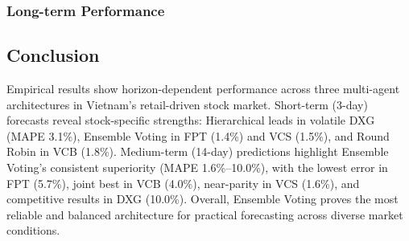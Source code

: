 \documentclass{ieeeaccess}
\begin{document}
\subsubsection{Long-term Performance}
\begin{table}[!h]
\centering
\caption{Average Long-term Performance of Prediction Architectures Across Stocks (LLM: Google Gemini 2.0 Flash)}
\end{table}

\subsection{Conclusion}
Empirical results show horizon-dependent performance across three multi-agent architectures in Vietnam's retail-driven stock market. Short-term (3-day) forecasts reveal stock-specific strengths: Hierarchical leads in volatile DXG (MAPE 3.1\%), Ensemble Voting in FPT (1.4\%) and VCS (1.5\%), and Round Robin in VCB (1.8\%). Medium-term (14-day) predictions highlight Ensemble Voting's consistent superiority (MAPE 1.6\%–10.0\%), with the lowest error in FPT (5.7\%), joint best in VCB (4.0\%), near-parity in VCS (1.6\%), and competitive results in DXG (10.0\%). Overall, Ensemble Voting proves the most reliable and balanced architecture for practical forecasting across diverse market conditions.
\end{document}
